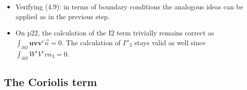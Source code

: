\documentclass[11pt]{article}
\begin{document}
\begin{itemize}
   using the divergence-free condition and $\mathbf{u}^\epsilon = 0$ on $\partial \Omega.$
   
   \item Verifying (4.9): in terms of boundary conditions the analogous ideas can be applied as in the previous step.
   
   \item On p22, the calculation of the I2 term trivially remains correct as $\int_{\partial \Omega} \mathbf{u} \mathbf{v} \mathbf{v}^\epsilon \vec{n} = 0.$ The calculation of $I''_2$ stays valid as well since
   $\int_{\partial \Omega} W^\epsilon V^\epsilon v n_3 = 0.$

\end{itemize}

\subsection{The Coriolis term}
\end{document}
